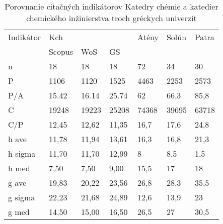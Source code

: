 \begin{table}
  \label{tab:kazakis.results}
  \caption{Porovnanie citačných indikátorov Katedry chémie a katedier chemického inžinierstva troch gréckych univerzít \citep{Kazakis2015}}
\begin{tabular}{lllllll}
\hline
 Indikátor & Kch    &       &       & Atény & Solún & Patra \\
           & Scopus & WoS   & GS    &       &       &       \\
 n         & 18     & 18    & 18    & 72    & 34    & 30    \\
 P         & 1106   & 1120  & 1525  & 4463  & 2253  & 2573  \\
 P/A       & 15.42  & 16.14 & 25.74 & 62    & 66,3  & 85,8  \\
 C         & 19248  & 19223 & 25208 & 74368 & 39695 & 63718 \\
 C/P       & 12,45  & 12,62 & 11,35 & 16,7  & 17,6  & 24,8  \\
 h ave     & 11,78  & 11,94 & 13,61 & 16,3  & 16,8  & 21,3  \\
 h sigma   & 11,70  & 11,70 & 12,99 & 8     & 8,5   & 1,5   \\
 h med     & 7,50   & 7,50  & 9,00  & 15,5  & 17    & 18    \\
 g ave     & 19,83  & 20,22 & 23,56 & 26,8  & 28,3  & 35,5  \\
 g sigma   & 22,23  & 21,68 & 24,89 & 12,6  & 13,9  & 23    \\
 g med     & 14,50  & 15,00 & 16,50 & 26,5  & 27    & 30,5  \\
\hline
\end{tabular}
\end{table}

